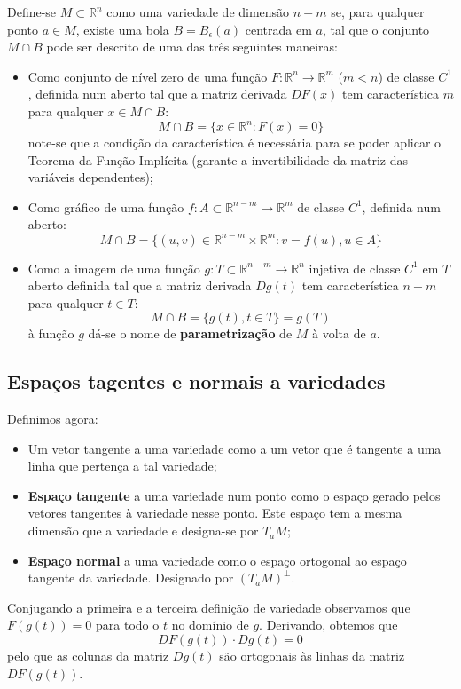 \documentclass{article}
\newcommand{\R}{\mathbb{R}}
\begin{document}
Define-se $M \subset \R^n$ como uma variedade de dimensão $n-m$ se, para qualquer ponto $a \in M$, existe uma bola $B = B_\epsilon(a)$ centrada em $a$, tal que o conjunto $M \cap B$ pode ser descrito de uma das três seguintes maneiras:
\begin{itemize}
    \item Como conjunto de nível zero de uma função $F: \R^n \to \R^m$ ($m<n$) de classe $C^1$, definida num aberto tal que a matriz derivada $DF(x)$ tem característica $m$ para qualquer $x \in M \cap B$:
$$ M \cap B = \{ x \in \R^n: F(x) = 0 \} $$
note-se que a condição da característica é necessária para se poder aplicar o Teorema da Função Implícita (garante a invertibilidade da matriz das variáveis dependentes);
    \item Como gráfico de uma função $f: A \subset \R^{n-m} \to \R^m$ de classe $C^1$, definida num aberto:
$$ M \cap B = \{ (u,v) \in \R^{n-m} \times \R^m: v=f(u), u \in A \} $$
    \item Como a imagem de uma função $g: T \subset \R^{n-m} \to \R^n$ injetiva de classe $C^1$ em $T$ aberto definida tal que a matriz derivada $Dg(t)$ tem característica $n-m$ para qualquer $t \in T$:
$$ M \cap B = \{ g(t), t \in T \} = g(T) $$
à função $g$ dá-se o nome de \textbf{parametrização} de $M$ à volta de $a$.
\end{itemize}

\subsection{Espaços tagentes e normais a variedades}
Definimos agora:
\begin{itemize}
    \item Um vetor tangente a uma variedade como a um vetor que é tangente a uma linha que pertença a tal variedade;
    \item \textbf{Espaço tangente} a uma variedade num ponto como o espaço gerado pelos vetores tangentes à variedade nesse ponto. Este espaço tem a mesma dimensão que a variedade e designa-se por $T_aM$;
    \item \textbf{Espaço normal} a uma variedade como o espaço ortogonal ao espaço tangente da variedade. Designado por $(T_aM)^\perp$.
\end{itemize}
Conjugando a primeira e a terceira definição de variedade observamos que $F(g(t))=0$ para todo o $t$ no domínio de $g$. Derivando, obtemos que
$$ DF(g(t)) \cdot Dg(t) = 0 $$
pelo que as colunas da matriz $Dg(t)$ são ortogonais às linhas da matriz $DF(g(t))$. 
\end{document}
